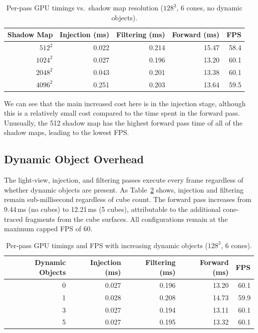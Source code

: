 \documentclass[12pt]{article}
\begin{document}
\begin{table}[H]
\centering
\caption{Per-pass GPU timings vs.\ shadow map resolution ($128^3$, 6 cones, no dynamic objects).}
\label{tab:shadowmap}
\begin{tabular}{rrrrr}
\toprule
Shadow Map & Injection (ms) & Filtering (ms) & Forward (ms) & FPS \\
\midrule
$512^2$  & 0.022 & 0.214 & 15.47 & 58.4 \\
$1024^2$ & 0.027 & 0.196 & 13.20 & 60.1 \\
$2048^2$ & 0.043 & 0.201 & 13.38 & 60.1 \\
$4096^2$ & 0.251 & 0.203 & 13.64 & 59.5 \\
\bottomrule
\end{tabular}
\end{table}

We can see that the main increased cost here is in the injection stage, although this is a relatively small cost compared to the time spent in the forward pass. Unusually, the 512 shadow map has the highest forward pass time of all of the shadow maps, leading to the lowest FPS.

\subsection{Dynamic Object Overhead}

The light-view, injection, and filtering passes execute every frame regardless of whether dynamic objects are present. As Table~\ref{tab:dynamic} shows, injection and filtering remain sub-millisecond regardless of cube count. The forward pass increases from 9.44\,ms (no cubes) to 12.21\,ms (5 cubes), attributable to the additional cone-traced fragments from the cube surfaces. All configurations remain at the maximum capped FPS of 60.

\begin{table}[H]
\centering
\caption{Per-pass GPU timings and FPS with increasing dynamic objects ($128^3$, 6 cones).}
\label{tab:dynamic}
\begin{tabular}{rrrrr}
\toprule
Dynamic Objects & Injection (ms) & Filtering (ms) & Forward (ms) & FPS \\
\midrule
0 & 0.027 & 0.196 & 13.20 & 60.1 \\
1 & 0.028 & 0.208 & 14.73 & 59.9 \\
3 & 0.027 & 0.194 & 13.11 & 60.1 \\
5 & 0.027 & 0.195 & 13.32 & 60.1 \\
\bottomrule
\end{tabular}
\end{table}
\end{document}
